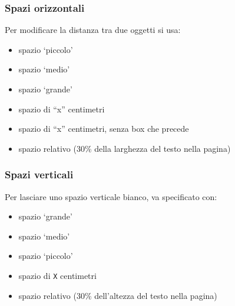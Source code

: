 \documentclass[svgnames,%
	ucs,%
	pdftex]{guitbeamer}
\begin{document}
\begin{frame}
  \frametitle{Spazi orizzontali}
	Per modificare la distanza tra due oggetti si usa:
	\begin{itemize}
		\item{} spazio `piccolo'
		\item{} spazio `medio'
		\item{} spazio `grande'
		\item{} spazio di ``x'' centimetri
		\item{} spazio di ``x'' centimetri, senza box che precede
		\item{} spazio relativo (30\% della larghezza del testo nella pagina)
	\end{itemize}
\end{frame}
\begin{frame}
  \frametitle{Spazi verticali}
	Per lasciare uno spazio verticale bianco, va specificato con:
	\begin{itemize}
		\item{} spazio `grande'
		\item{} spazio `medio'
		\item{} spazio `piccolo'
		\item{} spazio di \texttt{X} centimetri
		\item{} spazio relativo (30\% dell'altezza del testo nella pagina)
	\end{itemize}
\end{frame}
\end{document}
